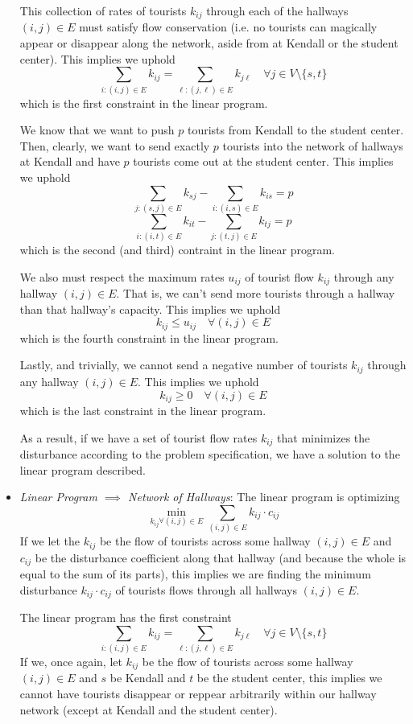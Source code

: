 \documentclass[12pt,twoside]{article}
\begin{document}
\begin{problems}
\begin{problemparts}
\begin{itemize}
  This collection of rates of tourists $k_{ij}$ through each of the hallways
  $(i, j) \in E$ must satisfy flow conservation (i.e. no tourists can
  magically appear or disappear along the network, aside from at Kendall or
  the student center). This implies we uphold
  $$ \sum_{i:(i, j) \in E} k_{ij} = \sum_{\ell:(j, \ell) \in E}
  k_{j\ell}\quad \forall j \in V \setminus \{s, t\} $$
  which is the first constraint in the linear program. 
  
  We know that we want to push $p$ tourists from Kendall to the student
  center. Then, clearly, we want to send exactly $p$ tourists into the
  network of hallways at Kendall and have $p$ tourists come out at the
  student center. This implies we uphold
  $$ \sum_{j:(s, j) \in E} k_{sj} - \sum_{i:(i, s) \in E} k_{is} = p $$
  $$ \sum_{i:(i, t) \in E} k_{it} - \sum_{j:(t, j) \in E} k_{tj} = p $$
  which is the second (and third) contraint in the linear program.

  We also must respect the maximum rates $u_{ij}$ of tourist flow $k_{ij}$
  through any hallway $(i, j) \in E$. That is, we can't send more tourists
  through a hallway than that hallway's capacity. This implies we uphold
  $$ k_{ij} \leq u_{ij}\quad \forall (i, j) \in E $$
  which is the fourth constraint in the linear program.

  Lastly, and trivially, we cannot send a negative number of tourists
  $k_{ij}$ through any hallway $(i, j) \in E$. This implies we uphold
  $$ k_{ij} \geq 0\quad \forall (i, j) \in E $$
  which is the last constraint in the linear program.

  As a result, if we have a set of tourist flow rates $k_{ij}$ that minimizes
  the disturbance according to the problem specification, we have a solution
  to the linear program described.

  \item {\it Linear Program $\implies$ Network of Hallways}: The
  linear program is optimizing
  $$ \min_{k_{ij} \forall (i, j) \in E} \sum_{(i, j) \in E} k_{ij} \cdot
  c_{ij} $$
  If we let the $k_{ij}$ be the flow of tourists across some hallway $(i, j)
  \in E$ and $c_{ij}$ be the disturbance coefficient along that hallway (and
  because the whole is equal to the sum of its parts), this implies we are
  finding the minimum disturbance $k_{ij} \cdot c_{ij}$ of tourists flows
  through all hallways $(i, j) \in E$.

  The linear program has the first constraint
  $$ \sum_{i:(i, j) \in E} k_{ij} = \sum_{\ell:(j, \ell) \in E}
  k_{j\ell}\quad \forall j \in V \setminus \{s, t\} $$
  If we, once again, let $k_{ij}$ be the flow of tourists across some hallway
  $(i, j) \in E$ and $s$ be Kendall and $t$ be the student center, this
  implies we cannot have tourists disappear or reppear arbitrarily within our
  hallway network (except at Kendall and the student center).


\end{itemize}
\end{problemparts}
\end{problems}
\end{document}
